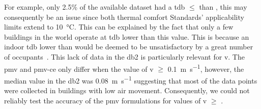 For example, only 2.5\% of the available dataset had a \ac{tdb} $\leq$ than , this may consequently be an issue since both thermal comfort Standards' applicability limits extend to \qty{10}{\celsius}.
This can be explained by the fact that only a few buildings in the world operate at \ac{tdb} lower than this value.
This is because an indoor \ac{tdb} lower than  would be deemed to be unsatisfactory by a great number of occupants~\cite{iso7730}.
This lack of data in the \ac{db2} is particularly relevant for \ac{v}.
The \ac{pmv} and \ac{pmv-ce} only differ when the value of \ac{v} $\geq$ \qty{0.1}{\m\per\s}, however, the median value in the \ac{db2} was \qty{0.08}{\m\per\s} suggesting that most of the data points were collected in buildings with low air movement.
Consequently, we could not reliably test the accuracy of the \ac{pmv} formulations for values of \ac{v} $\geq$ .

